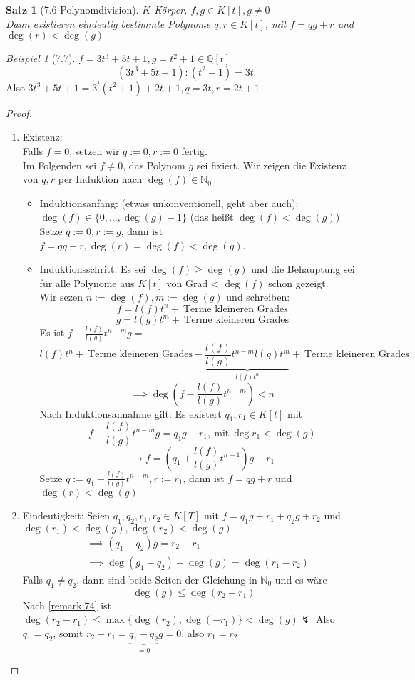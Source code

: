 \documentclass[a4paper]{scrartcl}
\theoremstyle{definition}
\theoremstyle{plain}
\newtheorem{thm}{Satz}
\theoremstyle{plain}
\theoremstyle{remark}
\theoremstyle{remark}
\theoremstyle{remark}
\theoremstyle{remark}
\theoremstyle{remark}
\newtheorem{ex}{Beispiel}
\begin{document}
\begin{thm}[7.6 Polynomdivision]
\label{thm:poly_div}
$K$ Körper, $f,g\in K[t], g\neq 0$ \\
  Dann existieren eindeutig bestimmte Polynome $q,r \in K[t]$, mit $f = q g + r$ und $\deg(r) < \deg(g)$
\end{thm}

\begin{ex}[7.7]
$f = 3 t^3 + 5 t + 1, g = t^2 + 1 \in\mathbb{Q}[t]$
\[(3 t^3 + 5 t + 1) : (t ^2 + 1) = 3 t\]
Also $3 t^3 + 5t + 1 = 3^t (t^2 + 1) + 2 t + 1, q = 3 t, r = 2 t + 1$
\end{ex}

\begin{proof}
\begin{enumerate}
\item Existenz: \\
     Falls $f = 0$, setzen wir $q := 0, r:= 0$ fertig. \\
     Im Folgenden sei $f\neq 0$, das Polynom $g$ sei fixiert. Wir zeigen die Existenz von $q,r$ per Induktion nach $\deg(f) \in\mathbb{N}_0$ \\
\begin{itemize}
\item Induktionsanfang: (etwas unkonventionell, geht aber auch): $\deg(f) \in \{0,\ldots,\deg(g) - 1\}$ (das heißt $\deg(f) < \deg(g)$) \\
       Setze $q:= 0, r:= g$, dann ist $f = q g + r, \deg(r) = \deg(f) < \deg(g)$.
\item Induktionsschritt: Es sei $\deg(f) \geq \deg(g)$ und die Behauptung sei für alle Polynome aus $K[t]$ von Grad < $\deg(f)$ schon gezeigt. \\
       Wir sezen $n:= \deg(f), m:=\deg(g)$ und schreiben:
\[f = l(f)t^n + ~\text{Terme kleineren Grades}\]
\[g = l(g) t^m + ~\text{Terme kleineren Grades}\]
Es ist $f - \frac{l(f)}{l(g)}t^{n - m}g =$
\[l(f) t^n + ~\text{Terme kleineren Grades} - \underbrace{\frac{l(f)}{l(g)} t^{n - m}l(g) t^m}_{l(f)t^n} + ~\text{Terme kleineren Grades}\]
\[\implies \deg(f - \frac{l(f)}{l(g)}t^{n - m}) < n\]
Nach Induktionsannahme gilt: Es existert $q_1,r_1 \in K[t]$ mit
\[f - \frac{l(f)}{l(g)}t^{n -m}g = q_1 g + r_1, ~\text{mit}~\deg{r_1} < \deg(g)\]
\[\rightarrow f = (q_1 + \frac{l(f)}{l(g)} t^{n - 1})g + r_1\]
Setze $q:= q_1 + \frac{l(f)}{l(g)}t^{n - m}, r:= r_1$, dann ist $f = q g + r$ und $\deg(r) < \deg(g)$
\end{itemize}
\item Eindeutigkeit: Seien $q_1,q_2,r_1,r_2\in K[T]$ mit $f = q_1 g + r_1 + q_2 g + r_2$ und $\deg(r_1) < \deg(g), \deg(r_2) < \deg(g)$
\begin{align*}
&\implies (q_1 - q_2) g = r_2 - r_1 \\
&\implies \deg(g_1 - q_2) + \deg(g) = \deg(r_1 - r_2)
\end{align*}
Falls $q_1 \neq q_2$, dann sind beide Seiten der Gleichung in $\mathbb{N}_0$ und es wäre
\[\deg(g) \leq \deg(r_2 - r_1)\]
Nach \ref{remark:74} ist $\deg(r_2 - r_1) \leq \max\{\deg(r_2),\deg(-r_1)\} < \deg(g) \lightning$
Also $q_1 = q_2$, somit $r_2 - r_1 = \underbrace{q_1 - q_2}_{= 0} g = 0$, also $r_1 = r_2$
\end{enumerate}
\end{proof}
\end{document}
